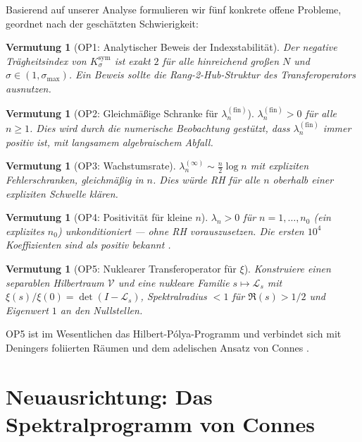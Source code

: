 \documentclass[12pt,a4paper]{article}
\newtheorem{conjecture}[theorem]{Vermutung}
\theoremstyle{definition}
\theoremstyle{remark}
\newcommand{\Ksym}{K_\sigma^{\mathrm{sym}}}
\begin{document}
Basierend auf unserer Analyse formulieren wir fünf konkrete offene Probleme, geordnet nach der geschätzten Schwierigkeit:

\begin{conjecture}[OP1: Analytischer Beweis der Indexstabilität]
Der negative Trägheitsindex von $\Ksym$ ist exakt $2$ für alle hinreichend großen $N$ und $\sigma \in (1, \sigma_{\max})$. Ein Beweis sollte die Rang-2-Hub-Struktur des Transferoperators ausnutzen.
\end{conjecture}

\begin{conjecture}[OP2: Gleichmäßige Schranke für $\lambda_n^{(\mathrm{fin})}$]
$\lambda_n^{(\mathrm{fin})} > 0$ für alle $n \geq 1$. Dies wird durch die numerische Beobachtung gestützt, dass $\lambda_n^{(\mathrm{fin})}$ immer positiv ist, mit langsamem algebraischem Abfall.
\end{conjecture}

\begin{conjecture}[OP3: Wachstumsrate]
$\lambda_n^{(\infty)} \sim \frac{n}{2}\log n$ mit expliziten Fehlerschranken, gleichmäßig in $n$. Dies würde RH für alle $n$ oberhalb einer expliziten Schwelle klären.
\end{conjecture}

\begin{conjecture}[OP4: Positivität für kleine $n$]
$\lambda_n > 0$ für $n = 1, \ldots, n_0$ (ein explizites $n_0$) unkonditioniert --- ohne RH vorauszusetzen. Die ersten $10^4$ Koeffizienten sind als positiv bekannt \cite{Keiper1992}.
\end{conjecture}

\begin{conjecture}[OP5: Nuklearer Transferoperator für $\xi$]
Konstruiere einen separablen Hilbertraum $\mathcal{V}$ und eine nukleare Familie $s \mapsto \mathcal{L}_s$ mit $\xi(s)/\xi(0) = \det(I - \mathcal{L}_s)$, Spektralradius $< 1$ für $\Re(s) > 1/2$ und Eigenwert $1$ an den Nullstellen.
\end{conjecture}

OP5 ist im Wesentlichen das Hilbert-Pólya-Programm und verbindet sich mit Deningers foliierten Räumen \cite{Deninger2002} und dem adelischen Ansatz von Connes \cite{Connes1999}.


\section{Neuausrichtung: Das Spektralprogramm von Connes}
\label{sec:reorientation}
\end{document}
